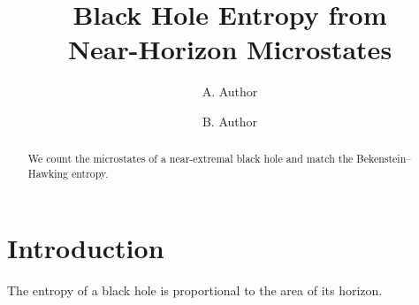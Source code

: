 \documentclass[letterpaper]{article}
\title{Black Hole Entropy from\\ Near-Horizon Microstates}
\author{A. Author \and B. Author}
\date{}
\begin{document}
\maketitle
\begin{abstract}
We count the microstates of a near-extremal black hole and match the Bekenstein--Hawking entropy.
\end{abstract}
\section{Introduction}
The entropy of a black hole is proportional to the area of its horizon.
\end{document}
